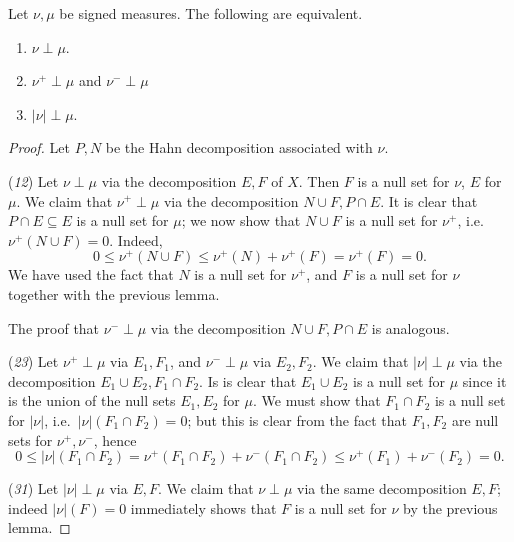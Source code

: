 \documentclass[11pt]{article}
\theoremstyle{definition}
\theoremstyle{remark}
\begin{document}
    \begin{lemma}
        Let $\nu, \mu$ be signed measures. The following are equivalent. \begin{enumerate}
            \item $\nu \perp \mu$.
            \item $\nu^+ \perp \mu$ and $\nu^- \perp \mu$
            \item $|\nu| \perp \mu$.
        \end{enumerate}
    \end{lemma}
    \begin{proof}
        Let $P, N$ be the Hahn decomposition associated with $\nu$.

        (\emph{1}\Rightarrow \emph{2}) Let $\nu \perp \mu$ via the decomposition $E,
        F$ of $X$. Then $F$ is a null set for $\nu$, $E$ for $\mu$. We claim that
        $\nu^+\perp \mu$ via the decomposition $N \cup F, P \cap E$. It is clear that
        $P \cap E \subseteq E$ is a null set for $\mu$; we now show that $N \cup F$
        is a null set for $\nu^+$, i.e.\ $\nu^+(N \cup F) = 0$. Indeed, \[
            0 \leq \nu^+(N \cup F) \leq \nu^+(N) + \nu^+(F) = \nu^+(F) = 0.
        \] We have used the fact that $N$ is a null set for $\nu^+$, and $F$ is a
        null set for $\nu$ together with the previous lemma.

        The proof that $\nu^-\perp \mu$ via the decomposition $N \cup F, P \cap E$
        is analogous.

        (\emph{2}\Rightarrow \emph{3}) Let $\nu^+\perp\mu$ via $E_1, F_1$, and
        $\nu^-\perp\mu$ via $E_2, F_2$. We claim that $|\nu| \perp \mu$ via the
        decomposition $E_1 \cup E_2, F_1 \cap F_2$. Is is clear that $E_1 \cup E_2$
        is a null set for $\mu$ since it is the union of the null sets $E_1, E_2$ for
        $\mu$. We must show that $F_1 \cap F_2$ is a null set for $|\nu|$, i.e.\
        $|\nu|(F_1 \cap F_2) = 0$; but this is clear from the fact that $F_1, F_2$
        are null sets for $\nu^+, \nu^-$, hence \[
            0 \leq |\nu|(F_1 \cap F_2) = \nu^+(F_1 \cap F_2) + \nu^-(F_1 \cap F_2)
            \leq \nu^+(F_1) + \nu^-(F_2) = 0.
        \]

        (\emph{3}\Rightarrow \emph{1}) Let $|\nu| \perp \mu$ via $E, F$. We claim
        that $\nu\perp\mu$ via the same decomposition $E, F$; indeed $|\nu|(F) = 0$
        immediately shows that $F$ is a null set for $\nu$ by the previous lemma.
    \end{proof}
\end{document}
